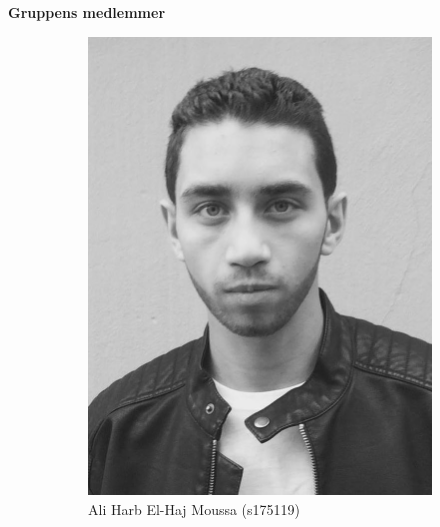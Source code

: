 \thispagestyle{empty}

\noindent
{\huge\textbf{Gruppens medlemmer}}
\begin{figure}[H]
	\centering
	
	\begin{subfigure}{0.25\textwidth}
		\includegraphics[width=\linewidth]{graphics/members/ali}
		\caption*{Ali Harb El-Haj Moussa (s175119)}
	\end{subfigure}\hfil
	\begin{subfigure}{0.25\textwidth}

\end{subfigure}
\end{figure}
